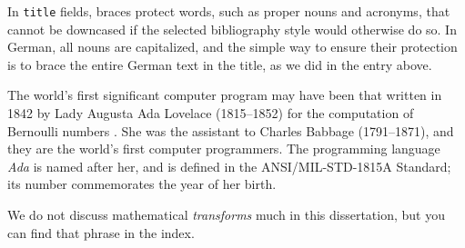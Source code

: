 In \BibTeX{} \verb=title= fields, braces protect words, such as
proper nouns and acronyms, that cannot be downcased if the selected
bibliography style would otherwise do so.  In German, all nouns are
capitalized, and the simple way to ensure their protection is to brace
the entire German text in the title, as we did in the entry above.

The world's first significant computer program may
have been that written in 1842 by Lady Augusta Ada
Lovelace%
(1815--1852) for the computation of Bernoulli
numbers \cite{Huskey:1980:LLC,Kim:1999:AFC}.  She
was the assistant to Charles Babbage%
(1791--1871), and they are the world's first
computer programmers. The programming language
\emph{Ada} is named after her, and is defined in
the ANSI/MIL-STD-1815A Standard; its number
commemorates the year of her birth.

We do not discuss mathematical \emph{transforms}%
much in this dissertation, but you can find that phrase in the index.

\blah

\blah
\blah

\blah









